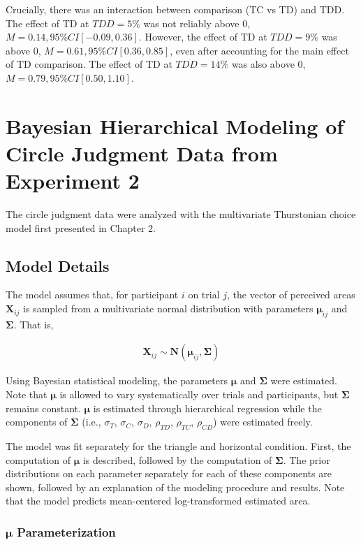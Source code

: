 Crucially, there was an interaction between comparison (TC vs TD) and TDD. The effect of TD at $TDD=5\%$ was not reliably above 0, $\mathit{M}=0.14, 95\%CI [-0.09, 0.36]$. However, the effect of TD at $TDD=9\%$ was above 0, $\mathit{M}=0.61, 95\%CI [0.36, 0.85]$, even after accounting for the main effect of TD comparison. The effect of TD at $TDD=14\%$ was also above 0, $\mathit{M}=0.79, 95\%CI [0.50, 1.10]$.

\chapter{Bayesian Hierarchical Modeling of Circle Judgment Data from Experiment 2}

The circle judgment data were analyzed with the multivariate Thurstonian choice model first presented in Chapter 2. 

\section{Model Details}

The model assumes that, for participant $i$ on trial $j$, the vector of perceived areas $\bm{X}_{ij}$ is sampled from a multivariate normal distribution with parameters $\boldsymbol{\mu}_{ij}$ and $\boldsymbol{\Sigma}$. That is,

\begin{align}
    \bm{X}_{ij} \sim \bm{N}(\boldsymbol{\mu}_{ij}, \boldsymbol{\Sigma})
\end{align}

Using Bayesian statistical modeling, the parameters $\boldsymbol{\mu}$ and $\boldsymbol{\Sigma}$ were estimated. Note that $\boldsymbol{\mu}$ is allowed to vary systematically over trials and participants, but $\boldsymbol{\Sigma}$ remains constant. $\boldsymbol{\mu}$ is estimated through hierarchical regression while the components of $\boldsymbol{\Sigma}$ (i.e., $\sigma_{T}$, $\sigma_{C}$, $\sigma_{D}$, $\rho_{TD}$, $\rho_{TC}$, $\rho_{CD}$) were estimated freely. 

The model was fit separately for the triangle and horizontal condition. First, the computation of $\boldsymbol{\mu}$ is described, followed by the computation of $\boldsymbol{\Sigma}$. The prior distributions on each parameter separately for each of these components are shown, followed by an explanation of the modeling procedure and results. Note that the model predicts mean-centered log-transformed estimated area.

\subsection{\texorpdfstring{$\boldsymbol{\mu}$}{mu} Parameterization}

